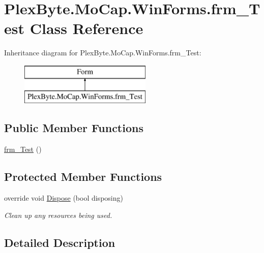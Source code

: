 \hypertarget{class_plex_byte_1_1_mo_cap_1_1_win_forms_1_1frm___test}{}\section{Plex\+Byte.\+Mo\+Cap.\+Win\+Forms.\+frm\+\_\+\+Test Class Reference}
\label{class_plex_byte_1_1_mo_cap_1_1_win_forms_1_1frm___test}
Inheritance diagram for Plex\+Byte.\+Mo\+Cap.\+Win\+Forms.\+frm\+\_\+\+Test\+:\begin{figure}[H]
\begin{center}
\leavevmode
\includegraphics[height=2.000000cm]{class_plex_byte_1_1_mo_cap_1_1_win_forms_1_1frm___test}
\end{center}
\end{figure}
\subsection*{Public Member Functions}
\begin{DoxyCompactItemize}
\item 
\hyperlink{class_plex_byte_1_1_mo_cap_1_1_win_forms_1_1frm___test_abe776796af03a79e1064b4b557646a7b}{frm\+\_\+\+Test} ()
\end{DoxyCompactItemize}
\subsection*{Protected Member Functions}
\begin{DoxyCompactItemize}
\item 
override void \hyperlink{class_plex_byte_1_1_mo_cap_1_1_win_forms_1_1frm___test_a5c5e98552d5ddad39288d3ff784cd5f2}{Dispose} (bool disposing)
\begin{DoxyCompactList}\small\item\em Clean up any resources being used. \end{DoxyCompactList}\end{DoxyCompactItemize}


\subsection{Detailed Description}


